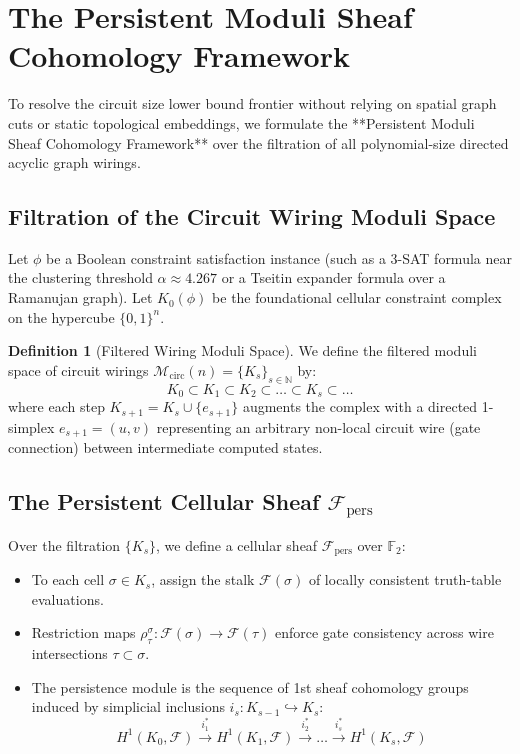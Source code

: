 \documentclass[11pt,a4paper]{article}
\theoremstyle{definition}
\newtheorem{definition}[theorem]{Definition}
\theoremstyle{remark}
\begin{document}
\section{The Persistent Moduli Sheaf Cohomology Framework}\label{sec:persistent_sheaf}

To resolve the circuit size lower bound frontier without relying on spatial graph cuts or static topological embeddings, we formulate the **Persistent Moduli Sheaf Cohomology Framework** over the filtration of all polynomial-size directed acyclic graph wirings.

\subsection{Filtration of the Circuit Wiring Moduli Space}
Let $\phi$ be a Boolean constraint satisfaction instance (such as a 3-SAT formula near the clustering threshold $\alpha \approx 4.267$ or a Tseitin expander formula over a Ramanujan graph). 
Let $K_0(\phi)$ be the foundational cellular constraint complex on the hypercube $\{0,1\}^n$.

\begin{definition}[Filtered Wiring Moduli Space]
We define the filtered moduli space of circuit wirings $\mathcal{M}_{\mathrm{circ}}(n) = \{K_s\}_{s \in \mathbb{N}}$ by:
\[
K_0 \subset K_1 \subset K_2 \subset \dots \subset K_s \subset \dots
\]
where each step $K_{s+1} = K_s \cup \{e_{s+1}\}$ augments the complex with a directed 1-simplex $e_{s+1} = (u, v)$ representing an arbitrary non-local circuit wire (gate connection) between intermediate computed states.
\end{definition}

\subsection{The Persistent Cellular Sheaf $\mathcal{F}_{\mathrm{pers}}$}
Over the filtration $\{K_s\}$, we define a cellular sheaf $\mathcal{F}_{\mathrm{pers}}$ over $\mathbb{F}_2$:
\begin{itemize}
    \item To each cell $\sigma \in K_s$, assign the stalk $\mathcal{F}(\sigma)$ of locally consistent truth-table evaluations.
    \item Restriction maps $\rho_\tau^\sigma: \mathcal{F}(\sigma) \to \mathcal{F}(\tau)$ enforce gate consistency across wire intersections $\tau \subset \sigma$.
    \item The persistence module is the sequence of 1st sheaf cohomology groups induced by simplicial inclusions $i_s: K_{s-1} \hookrightarrow K_s$:
    \[
    H^1(K_0, \mathcal{F}) \xrightarrow{i_1^*} H^1(K_1, \mathcal{F}) \xrightarrow{i_2^*} \dots \xrightarrow{i_s^*} H^1(K_s, \mathcal{F})
    \]
\end{itemize}
\end{document}
